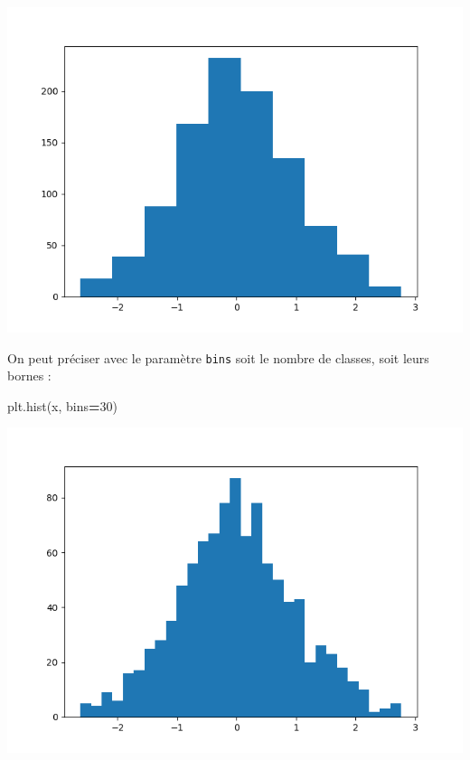\documentclass[12pt,]{book}
\newenvironment{Shaded}{\begin{snugshade}}{\end{snugshade}}
\newcommand{\DecValTok}[1]{\textcolor[rgb]{0.00,0.00,0.81}{#1}}
\newcommand{\OperatorTok}[1]{\textcolor[rgb]{0.81,0.36,0.00}{\textbf{#1}}}
\newcommand{\NormalTok}[1]{#1}
\numberwithin{equation}{section}
\numberwithin{countremarque}{section}
\begin{document}
\begin{center}\includegraphics[width=9.03in]{figs/pyplot/histogramme} \end{center}

On peut préciser avec le paramètre \texttt{bins} soit le nombre de
classes, soit leurs bornes :

\begin{Shaded}
\begin{Highlighting}[]
\NormalTok{plt.hist(x, bins}\OperatorTok{=}\DecValTok{30}\NormalTok{)}
\end{Highlighting}
\end{Shaded}

\begin{center}\includegraphics[width=9.03in]{figs/pyplot/histogramme_bins} \end{center}
\end{document}

